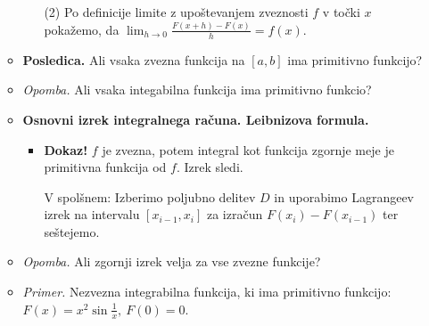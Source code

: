 \begin{enumerate}
\begin{itemize}
\begin{itemize}
            (2) Po definicije limite z upoštevanjem zveznosti $f$ v točki $x$ pokažemo, da $\displaystyle \lim_{h \to 0} \frac{F(x+h) - F(x)}{h} = f(x)$.
        \end{itemize}
        \item \colorbox{orange!30}{\textbf{Posledica.}} Ali vsaka zvezna funkcija na $[a,b]$ ima primitivno funkcijo?
        \item \colorbox{yellow!30}{\emph{Opomba.}} Ali vsaka integabilna funkcija ima primitivno funkcio?
        \item \colorbox{blue!30}{\textbf{Osnovni izrek integralnega računa. Leibnizova formula.}}
        \begin{itemize}
            \item \colorbox{green!50}{\textbf{Dokaz!}} $f$ je zvezna, potem integral kot funkcija zgornje meje je primitivna funkcija od $f$. Izrek sledi.
            
            V spolšnem: Izberimo poljubno delitev $D$ in uporabimo Lagrangeev izrek na intervalu $[x_{i-1}, x_i]$ za izračun $F(x_{i}) - F(x_{i - 1})$ ter seštejemo.
        \end{itemize}
        \item \colorbox{yellow!30}{\emph{Opomba.}} Ali zgornji izrek velja za vse zvezne funkcije?
        \item \colorbox{yellow!30}{\emph{Primer.}} Nezvezna integrabilna funkcija, ki ima primitivno funkcijo: $F(x) = x^2\sin \frac{1}{x}, \ F(0) = 0$.
    \end{itemize}
    

\end{enumerate}
